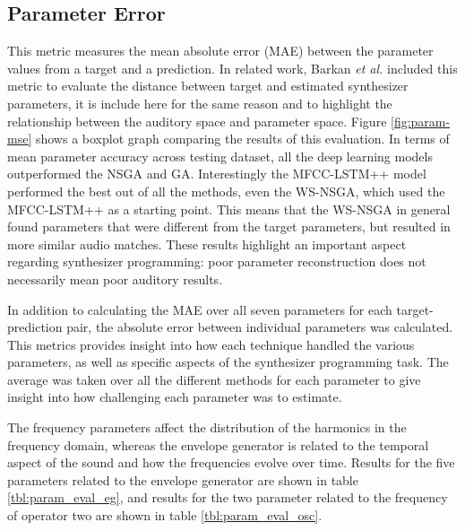 \subsection{Parameter Error}
This metric measures the mean absolute error (MAE) between the parameter values from a target and a prediction. In related work, Barkan \textit{et al.} included this metric to evaluate the distance between target and estimated synthesizer parameters, it is include here for the same reason and to highlight the relationship between the auditory space and parameter space. Figure \ref{fig:param-mse} shows a boxplot graph comparing the results of this evaluation. In terms of mean parameter accuracy across testing dataset, all the deep learning models outperformed the NSGA and GA. Interestingly the MFCC-LSTM++ model performed the best out of all the methods, even the WS-NSGA, which used the MFCC-LSTM++ as a starting point. This means that the WS-NSGA in general found parameters that were different from the target parameters, but resulted in more similar audio matches. These results highlight an important aspect regarding synthesizer programming: poor parameter reconstruction does not necessarily mean poor auditory results.

In addition to calculating the MAE over all seven parameters for each target-prediction pair, the absolute error between individual parameters was calculated. This metrics provides insight into how each technique handled the various parameters, as well as specific aspects of the synthesizer programming task. The average was taken over all the different methods for each parameter to give insight into how challenging each parameter was to estimate.

The frequency parameters affect the distribution of the harmonics in the frequency domain, whereas the envelope generator is related to the temporal aspect of the sound and how the frequencies evolve over time. Results for the five parameters related to the envelope generator are shown in table \ref{tbl:param_eval_eg}, and results for the two parameter related to the frequency of operator two are shown in table \ref{tbl:param_eval_osc}. 

